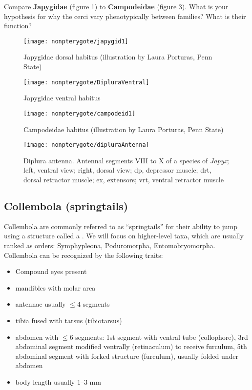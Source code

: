 \begin{theo}
{}Compare \textbf{Japygidae} (figure \ref{fig:japygidhab}) to \textbf{Campodeidae} (figure \ref{fig:campodeidhab}). What is your hypothesis for why the cerci vary phenotypically between families? What is their function?\end{theo}

\begin{figure}[ht!]
  \centering
    \texttt{[image: nonpterygote/japygid1]}
  \caption{Japygidae dorsal habitus (illustration by Laura Porturas, Penn State)}
  \label{fig:japygidhab}
\end{figure}
\begin{figure}[ht!]
  \centering
    \texttt{[image: nonpterygote/DipluraVentral]}
  \caption{Japygidae ventral habitus \citep[redrawn from][Fig. 8]{bhlitem30465Insects}}
  \label{fig:japygidhabvent}
\end{figure}

\begin{figure}[ht!]
  \centering
    \texttt{[image: nonpterygote/campodeid1]}
  \caption{Campodeidae habitus (illustration by Laura Porturas, Penn State)}
  \label{fig:campodeidhab}
\end{figure}

\begin{figure}[ht!]
  \centering
    \texttt{[image: nonpterygote/dipluraAntenna]}
  \caption{Diplura antenna. Antennal segments VIII to X of a species of \textit{Japyx}; left, ventral view; right, dorsal view; dp, depressor muscle; drt, dorsal retractor muscle; ex, extensors; vrt, ventral retractor muscle \citep[redrawn from][Fig. 2]{bhlpart81512}}
  \label{fig:dipluraAntenna}
\end{figure}

\subsection{Collembola (springtails)}
Collembola are commonly referred to as ``springtails'' for their ability to jump using a structure called a . We will focus on higher-level taxa, which are usually ranked as orders: Symphypleona, Poduromorpha, Entomobryomorpha. Collembola can be recognized by the following traits:

\begin{itemize}
\item Compound eyes present
\item mandibles with molar area
\item antennae usually $\leq$4 segments
\item tibia fused with tarsus (tibiotarsus)
\item abdomen with $\leq$6 segments: 1st segment with ventral tube (collophore), 3rd abdominal segment modified ventrally (retinaculum) to receive furculum, 5th abdominal segment with forked structure (furculum), usually folded under abdomen
\item body length usually 1--3 mm
\end{itemize}

